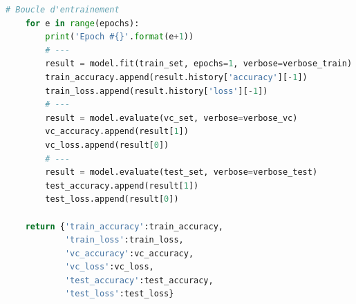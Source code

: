 \documentclass{article}
\begin{document}
\begin{lstlisting}[language=Python, caption={Fonction pour l'entraînement du modèle}, label={code:training}]
    # Boucle d'entrainement
    for e in range(epochs):
        print('Epoch #{}'.format(e+1))
        # ---
        result = model.fit(train_set, epochs=1, verbose=verbose_train)
        train_accuracy.append(result.history['accuracy'][-1])
        train_loss.append(result.history['loss'][-1])
        # ---
        result = model.evaluate(vc_set, verbose=verbose_vc)
        vc_accuracy.append(result[1])
        vc_loss.append(result[0])
        # ---
        result = model.evaluate(test_set, verbose=verbose_test)
        test_accuracy.append(result[1])
        test_loss.append(result[0])

    return {'train_accuracy':train_accuracy,
            'train_loss':train_loss,
            'vc_accuracy':vc_accuracy,
            'vc_loss':vc_loss,
            'test_accuracy':test_accuracy,
            'test_loss':test_loss}
\end{lstlisting}
\end{document}
